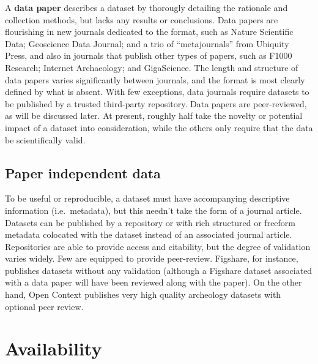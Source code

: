 \documentclass[10pt,a4paper,twocolumn]{article}
\begin{document}
A \textbf{data paper} describes a dataset by thorougly detailing the rationale and collection methods, but lacks any results or conclusions. 
Data papers are flourishing in new journals dedicated to the format, such as Nature Scientific Data\cite{nature_scientific_data}; Geoscience Data Journal\cite{geoscience_data_journal}; and a trio of ``metajournals'' from Ubiquity Press\cite{ubiquity_press_metajournals}, and also in journals that publish other types of papers, such as F1000 Research\cite{f1000_research}; Internet Archaeology\cite{internet_archaeology}; and GigaScience\cite{gigascience}. 
The length and structure of data papers varies significantly between journals, and the format is most clearly defined by what is absent.
With few exceptions, data journals require datasets to be published by a trusted third-party repository. 
Data papers are peer-reviewed, as will be discussed later.  At present, roughly half take the novelty or potential impact of a dataset into consideration, while the others only require that the data be scientifically valid.

\subsection*{Paper independent data}\label{paper-independent-data}

To be useful or reproducible, a dataset must have accompanying descriptive information (i.e.~metadata), but this needn't take the form of a journal article. 
Datasets can be published by a repository or with rich structured or freeform metadata colocated with the dataset instead of an associated journal article. Repositories are able to provide access and citability, but the degree of validation varies widely. 
Few are equipped to provide peer-review. Figshare\cite{figshare}, for instance, publishes datasets without any validation (although a Figshare dataset associated with a data paper will have been reviewed along with the paper). 
On the other hand, Open Context\cite{open_context} publishes very high quality archeology datasets with optional peer review.


\section*{Availability}\label{availability}
\end{document}
